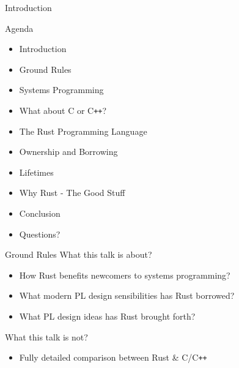 \begin{section}{Introduction}
  \begin{frame}{Agenda}
    \begin{itemize}
    \item Introduction
    \item Ground Rules
    \item Systems Programming
    \item What about C or C\texttt{++}?
    \item The Rust Programming Language
    \item Ownership and Borrowing
    \item Lifetimes
    \item Why Rust - The Good Stuff
    \item Conclusion
    \item Questions?
    \end{itemize}
  \end{frame}

  \begin{frame}{Ground Rules}
    What this talk is about?
    \begin{itemize}
    \item How Rust benefits newcomers to systems programming?
    \item What modern PL design sensibilities has Rust borrowed?
    \item What PL design ideas has Rust brought forth?
    \end{itemize}

    What this talk is not?
    \begin{itemize}
    \item Fully detailed comparison between Rust \& C/C\texttt{++}
    \end{itemize}
  \end{frame}
\end{section}
